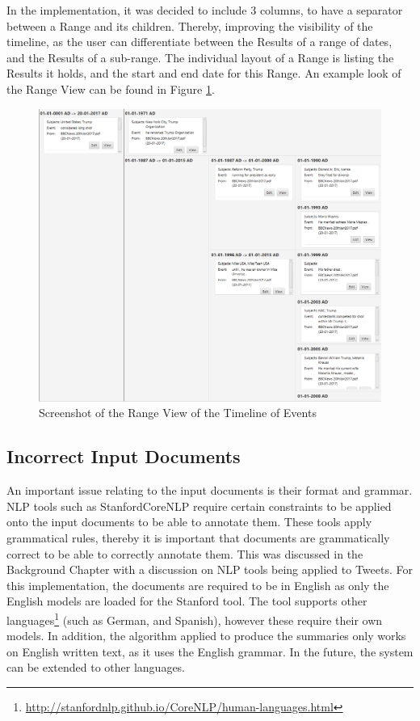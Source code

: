 \par  In the implementation, it was decided to include 3 columns, to have a separator between a Range and its children. Thereby, improving the visibility of the timeline, as the user can differentiate between the Results of a range of dates, and the Results of a sub-range. The individual layout of a Range is listing the Results it holds, and the start and end date for this Range. An example look of the Range View can be found in Figure \ref{fig:rangeView}.

\begin{figure}[H]
\caption{Screenshot of the Range View of the Timeline of Events}
\label{fig:rangeView}
\includegraphics[width=\linewidth]{rangeView.png}
\centering
\end{figure}
\subsection{Incorrect Input Documents}

\par An important issue relating to the input documents is their format and grammar. NLP tools such as StanfordCoreNLP require certain constraints to be applied onto the input documents to be able to annotate them. These tools apply grammatical rules, thereby it is important that documents are grammatically correct to be able to correctly annotate them. This was discussed in the Background Chapter with a discussion on NLP tools being applied to Tweets. For this implementation, the documents are required to be in English as only the English models are loaded for the Stanford tool. The tool supports other languages\footnote{\url{http://stanfordnlp.github.io/CoreNLP/human-languages.html}} (such as German, and Spanish), however these require their own models. In addition, the algorithm applied to produce the summaries only works on English written text, as it uses the English grammar. In the future, the system can be extended to other languages.


